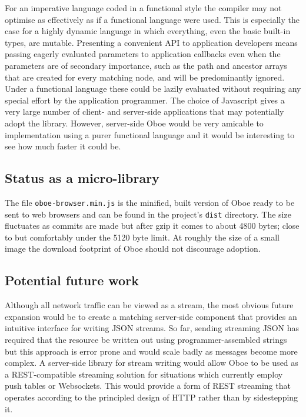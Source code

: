 \documentclass[12pt, ]{article}
\begin{document}
For an imperative language coded in a functional style the compiler may
not optimise as effectively as if a functional language were used. This
is especially the case for a highly dynamic language in which
everything, even the basic built-in types, are mutable. Presenting a
convenient API to application developers means passing eagerly evaluated
parameters to application callbacks even when the parameters are of
secondary importance, such as the path and ancestor arrays that are
created for every matching node, and will be predominantly ignored.
Under a functional language these could be lazily evaluated without
requiring any special effort by the application programmer. The choice
of Javascript gives a very large number of client- and server-side
applications that may potentially adopt the library. However,
server-side Oboe would be very amicable to implementation using a purer
functional language and it would be interesting to see how much faster
it could be.

\subsection{Status as a micro-library}\label{status-as-a-micro-library}

The file \texttt{oboe-browser.min.js} is the minified, built version of
Oboe ready to be sent to web browsers and can be found in the project's
\texttt{dist} directory. The size fluctuates as commits are made but
after gzip it comes to about 4800 bytes; close to but comfortably under
the 5120 byte limit. At roughly the size of a small image the download
footprint of Oboe should not discourage adoption.

\subsection{Potential future work}\label{potential-future-work}

Although all network traffic can be viewed as a stream, the most obvious
future expansion would be to create a matching server-side component
that provides an intuitive interface for writing JSON streams. So far,
sending streaming JSON has required that the resource be written out
using programmer-assembled strings but this approach is error prone and
would scale badly as messages become more complex. A server-side library
for stream writing would allow Oboe to be used as a REST-compatible
streaming solution for situations which currently employ push tables or
Websockets. This would provide a form of REST streaming that operates
according to the principled design of HTTP rather than by sidestepping
it.
\end{document}
